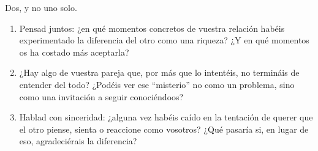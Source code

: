 Dos, y no uno solo.

\paracaminar

\begin{enumerate}
  \item Pensad juntos: ¿en qué momentos concretos de vuestra relación habéis experimentado la diferencia del otro como una riqueza? ¿Y en qué momentos os ha costado más aceptarla?

  \item ¿Hay algo de vuestra pareja que, por más que lo intentéis, no termináis de entender del todo? ¿Podéis ver ese ``misterio'' no como un problema, sino como una invitación a seguir conociéndoos?

  \item Hablad con sinceridad: ¿alguna vez habéis caído en la tentación de querer que el otro piense, sienta o reaccione como vosotros? ¿Qué pasaría si, en lugar de eso, agradeciérais la diferencia?
\end{enumerate}

